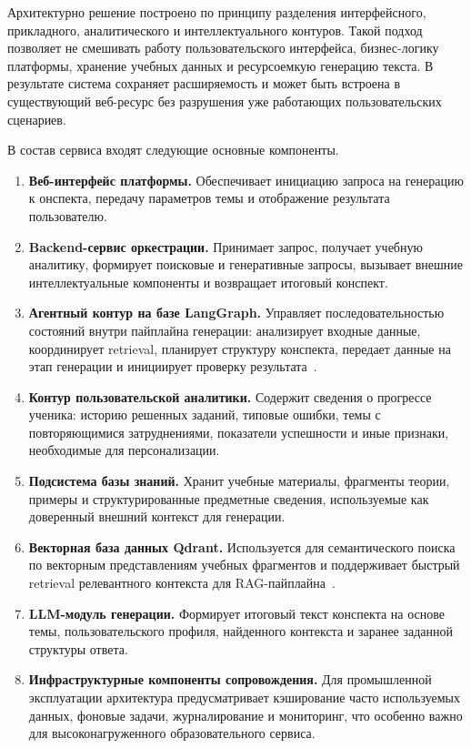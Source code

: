 \documentclass[a4paper,12pt]{extarticle}
\begin{document}
Архитектурно решение построено по принципу разделения интерфейсного, прикладного, 
аналитического и интеллектуального контуров. Такой подход позволяет не смешивать 
работу пользовательского интерфейса, бизнес-логику платформы, хранение учебных данных и 
ресурсоемкую генерацию текста. В результате система сохраняет расширяемость и может быть 
встроена в существующий веб-ресурс без разрушения уже работающих пользовательских сценариев.

В состав сервиса входят следующие основные компоненты.

\begin{enumerate}
    \item \textbf{Веб-интерфейс платформы.} Обеспечивает инициацию запроса на генерацию к
	онспекта, передачу параметров темы и отображение результата пользователю.
    \item \textbf{Backend-сервис оркестрации.} Принимает запрос, получает учебную аналитику, 
	формирует поисковые и генеративные запросы, вызывает внешние интеллектуальные компоненты 
	и возвращает итоговый конспект.
    \item \textbf{Агентный контур на базе LangGraph.} Управляет последовательностью состояний
	внутри пайплайна генерации: анализирует входные данные, координирует retrieval, планирует
	структуру конспекта, передает данные на этап генерации и инициирует проверку результата~\cite{langchain2024}.
    \item \textbf{Контур пользовательской аналитики.} Содержит сведения о прогрессе ученика: 
	историю решенных заданий, типовые ошибки, темы с повторяющимися затруднениями, 
	показатели успешности и иные признаки, необходимые для персонализации.
    \item \textbf{Подсистема базы знаний.} Хранит учебные материалы, фрагменты теории, 
	примеры и структурированные предметные сведения, используемые как доверенный внешний 
	контекст для генерации.
    \item \textbf{Векторная база данных Qdrant.} Используется для семантического поиска по 
	векторным представлениям учебных фрагментов и поддерживает быстрый retrieval 
	релевантного контекста для RAG-пайплайна~\cite{qdrant2026}.
    \item \textbf{LLM-модуль генерации.} Формирует итоговый текст конспекта на основе темы, 
	пользовательского профиля, найденного контекста и заранее заданной структуры ответа.
    \item \textbf{Инфраструктурные компоненты сопровождения.} Для промышленной эксплуатации 
	архитектура предусматривает кэширование часто используемых данных, фоновые задачи, 
	журналирование и мониторинг, что особенно важно для высоконагруженного образовательного 
	сервиса.
\end{enumerate}
\end{document}

